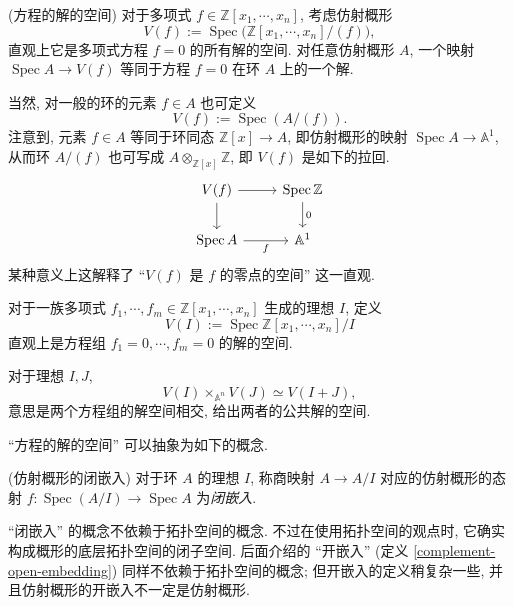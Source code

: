 \documentclass{book}
\begin{document}
	\begin{example}
		{(方程的解的空间)}
		对于多项式 $f\in\mathbb{Z}[x_1,\cdots,x_n]$,
		考虑仿射概形
		$$
		V(f) := \operatorname{Spec} \big(\mathbb{Z}[x_1,\cdots,x_n]/(f)\big),
		$$
		直观上它是多项式方程 $f=0$ 的所有解的空间.
		对任意仿射概形 $A$, 一个映射 $\operatorname{Spec} A\to V(f)$ 等同于方程 $f=0$ 在环 $A$ 上的一个解.
		
		当然, 对一般的环的元素 $f\in A$ 也可定义
		$$
		V(f) := \operatorname{Spec} (A/(f)).
		$$
		注意到, 元素 $f\in A$ 等同于环同态 $\mathbb{Z}[x]\to A$, 即仿射概形的映射 $\operatorname{Spec} A\to\mathbb{A}^1$, 从而环 $A/(f)$ 也可写成 $A\otimes_{\mathbb{Z}[x]}\mathbb Z$, 即 $V(f)$ 是如下的拉回.
		\[\begin{tikzcd}[ampersand replacement=\&]
			{V(f)} \& {\operatorname{Spec}\mathbb{Z}} \\
			{\operatorname{Spec} A} \& {\mathbb{A}^1}
			\arrow[from=1-1, to=1-2]
			\arrow[from=1-1, to=2-1]
			\arrow["0", from=1-2, to=2-2]
			\arrow["f"', from=2-1, to=2-2]
		\end{tikzcd}\]
		某种意义上这解释了 ``$V(f)$ 是 $f$ 的零点的空间'' 这一直观.
		
		对于一族多项式 $f_1,\cdots,f_m\in\mathbb{Z}[x_1,\cdots,x_n]$ 生成的理想 $I$,
		定义
		$$
		V(I) := \operatorname{Spec}\mathbb{Z}[x_1,\cdots,x_n]/I
		$$
		直观上是方程组 $f_1=0,\cdots,f_m=0$ 的解的空间.
		
		对于理想 $I,J$,
		$$
		V(I)\times_{\mathbb A^n}V(J) \simeq V(I+J),
		$$
		意思是两个方程组的解空间相交, 给出两者的公共解的空间.
	\end{example}
	
	``方程的解的空间'' 可以抽象为如下的概念.
	\begin{definition}
		[label={affine-scheme-closed-embedding}]
		{(仿射概形的闭嵌入)}
		对于环 $A$ 的理想 $I$,
		称商映射 $A\to A/I$ 对应的仿射概形的态射 $f\colon \operatorname{Spec} (A/I)\to \operatorname{Spec} A$ 为\emph{闭嵌入}.
	\end{definition}
	
	``闭嵌入'' 的概念不依赖于拓扑空间的概念. 不过在使用拓扑空间的观点时, 它确实构成概形的底层拓扑空间的闭子空间.
	后面介绍的 ``开嵌入'' (定义 \ref{complement-open-embedding}) 同样不依赖于拓扑空间的概念; 但开嵌入的定义稍复杂一些, 并且仿射概形的开嵌入不一定是仿射概形.
	
%		
	
\end{document}
